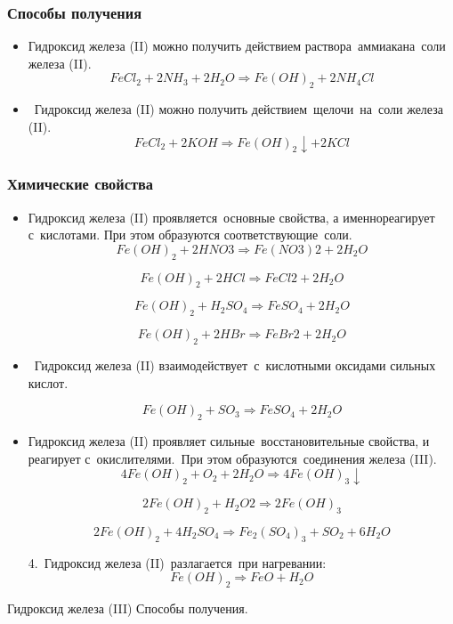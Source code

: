 \documentclass[11pt]{article}
\begin{document}
\subsubsection{Способы получения}
\begin{itemize}
\item Гидроксид железа (II) можно получить действием раствора аммиакана соли
железа (II).
$$FeCl _2    +   2NH _3    +   2H _2 O  \Rightarrow  Fe(OH) _2    +   2NH _4 Cl$$
\item Гидроксид железа (II) можно получить действием щелочи на соли железа
(II).
$$FeCl _2  + 2KOH \Rightarrow Fe(OH) _2 \downarrow + 2KCl$$
\end{itemize}

\subsubsection{Химические свойства}
\begin{itemize}
\item Гидроксид железа (II) проявляется основные свойства, а именнореагирует
с кислотами. При этом образуются соответствующие соли.
$$Fe(OH)_2  + 2HNO 3  \Rightarrow Fe(NO 3 ) 2  + 2H _2 O$$

$$Fe(OH)_2   +  2HCl \Rightarrow FeCl 2   +  2H _2 O$$

$$Fe(OH)_2   +  H _2 SO _4   \Rightarrow FeSO _4   +  2H _2 O$$

$$Fe(OH)_2   +  2HBr\Rightarrow FeBr 2   +  2H _2 O$$

\item Гидроксид железа (II) взаимодействует с кислотными оксидами сильных
кислот.

$$Fe(OH)_2  + SO _3   \Rightarrow   FeSO _4  + 2H _2 O$$

\item Гидроксид железа (II) проявляет сильные восстановительные свойства, и
реагирует с окислителями. При этом образуются соединения железа (III).
$$4Fe(OH)_2   +  O _2   +  2H _2 O  \Rightarrow   4Fe(OH) _3 \downarrow$$

$$2Fe(OH)_2    +  H _2 O 2     \Rightarrow  2Fe(OH) _3$$

$$2Fe(OH)_2   +  4H _2 SO _4   \Rightarrow Fe _2 (SO _4 ) _3   +  SO _2   +  6H _2 O$$

4. Гидроксид железа (II) разлагается при нагревании:
$$Fe(OH)_2   \Rightarrow  FeO  +  H _2 O$$
\end{itemize}
Гидроксид железа (III)
Способы получения.
\end{document}
